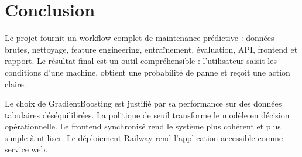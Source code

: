 \documentclass[12pt,a4paper]{report}
\begin{document}
\chapter{Conclusion}
Le projet fournit un workflow complet de maintenance prédictive : données brutes, nettoyage, feature engineering, entraînement, évaluation, API, frontend et rapport. Le résultat final est un outil compréhensible : l'utilisateur saisit les conditions d'une machine, obtient une probabilité de panne et reçoit une action claire.

Le choix de GradientBoosting est justifié par sa performance sur des données tabulaires déséquilibrées. La politique de seuil transforme le modèle en décision opérationnelle. Le frontend synchronisé rend le système plus cohérent et plus simple à utiliser. Le déploiement Railway rend l'application accessible comme service web.
\end{document}
